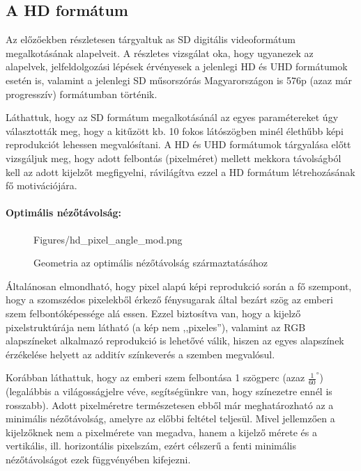 \subsection{A HD formátum}

Az előzőekben részletesen tárgyaltuk as SD digitális videoformátum megalkotásának alapelveit.
A részletes vizsgálat oka, hogy ugyanezek az alapelvek, jelfeldolgozási lépések érvényesek a jelenlegi HD és UHD formátumok esetén is, valamint a jelenlegi SD műsorszórás Magyarországon is 576p (azaz már progresszív) formátumban történik.

Láthattuk, hogy az SD formátum megalkotásánál az egyes paramétereket úgy választották meg, hogy a kitűzött kb. 10 fokos látószögben minél élethűbb képi reprodukciót lehessen megvalósítani.
A HD és UHD formátumok tárgyalása előtt vizsgáljuk meg, hogy adott felbontás (pixelméret) mellett mekkora távolságból kell az adott kijelzőt megfigyelni, rávilágítva ezzel a HD formátum létrehozásának fő motivációjára.

\paragraph{Optimális nézőtávolság:\\}

\begin{figure}[]
	\centering
	\begin{overpic}[width = 0.67 \columnwidth ]{Figures/hd_pixel_angle_mod.png}
	\small
	\end{overpic}
	\caption{Geometria az optimális nézőtávolság származtatásához}
	\label{Fig:optimal_vd}
\end{figure}

Általánosan elmondható, hogy pixel alapú képi reprodukció során a fő szempont, hogy a szomszédos pixelekből érkező fénysugarak által bezárt szög az emberi szem felbontóképessége alá essen.
Ezzel biztosítva van, hogy a kijelző pixelstruktúrája nem látható (a kép nem ,,pixeles''), valamint az RGB alapszíneket alkalmazó reprodukció is lehetővé válik, hiszen az egyes alapszínek érzékelése helyett az additív színkeverés a szemben megvalósul.

Korábban láthattuk, hogy az emberi szem felbontása 1 szögperc (azaz $\frac{1}{60}^{\circ}$) (legalábbis a világosságjelre véve, segítségünkre van, hogy színezetre ennél is rosszabb).
Adott pixelméretre természetesen ebből már meghatározható az a minimális nézőtávolság, amelyre az előbbi feltétel teljesül.
Mivel jellemzően a kijelzőknek nem a pixelmérete van megadva, hanem a kijelző mérete és a vertikális, ill. horizontális pixelszám, ezért célszerű a fenti minimális nézőtávolságot ezek függvényében kifejezni.

